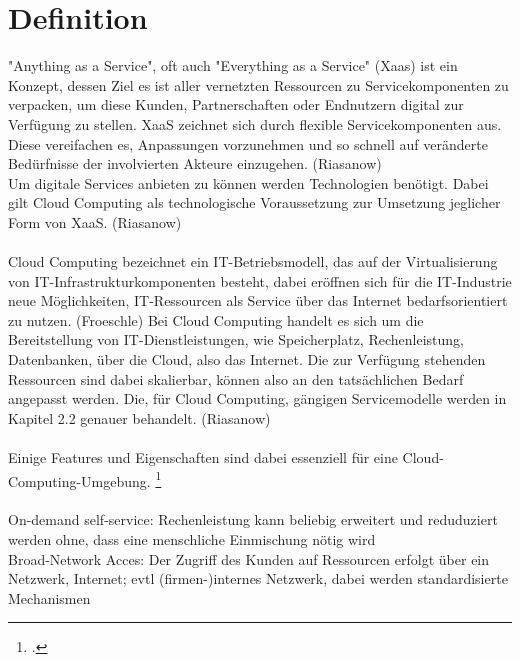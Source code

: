 \documentclass[12pt,toc=bib,toc=listof]{scrreprt}
\begin{document}
\section{Definition} %
\label{sec:Definition}

"Anything as a Service", oft auch "Everything as a Service" (Xaas) ist ein Konzept, dessen Ziel es ist aller vernetzten Ressourcen zu Servicekomponenten zu verpacken, um diese Kunden, Partnerschaften 
oder Endnutzern digital zur Verfügung zu stellen. XaaS zeichnet sich durch flexible Servicekomponenten aus. Diese vereifachen es, Anpassungen vorzunehmen
und so schnell auf veränderte Bedürfnisse der involvierten Akteure einzugehen. (Riasanow)
\\ 
Um digitale Services anbieten zu können werden Technologien benötigt. Dabei gilt Cloud Computing als technologische Voraussetzung zur Umsetzung jeglicher
Form von XaaS. (Riasanow)
 \\ \\
Cloud Computing bezeichnet ein IT-Betriebsmodell, das auf der Virtualisierung von IT-Infrastrukturkomponenten besteht, dabei eröffnen 
 sich für die IT-Industrie neue Möglichkeiten, IT-Ressourcen als Service über das Internet bedarfsorientiert zu nutzen. (Froeschle)
Bei Cloud Computing handelt es sich um die Bereitstellung von IT-Dienstleistungen, wie 
Speicherplatz, Rechenleistung, Datenbanken, über die Cloud, also das Internet. 
Die zur Verfügung stehenden Ressourcen sind dabei skalierbar, können also an den tatsächlichen Bedarf angepasst werden. Die, für Cloud Computing, gängigen Servicemodelle werden
in Kapitel 2.2 genauer behandelt. (Riasanow)
\\ \\
Einige Features und Eigenschaften sind dabei essenziell für eine Cloud-Computing-Umgebung. \footcite [Vgl.] []{Dangelo.2015}
\\ \\
On-demand self-service: Rechenleistung kann beliebig erweitert und reduduziert werden ohne, 
dass eine menschliche Einmischung nötig wird \\
Broad-Network Acces: Der Zugriff des Kunden auf Ressourcen erfolgt über ein Netzwerk, Internet; evtl (firmen-)internes Netzwerk, dabei werden standardisierte Mechanismen 
\end{document}
